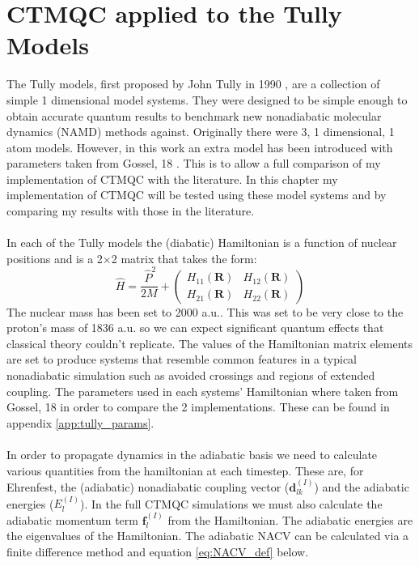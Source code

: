 \chapter{CTMQC applied to the Tully Models}
\label{chap:tully_models}

The Tully models, first proposed by John Tully in 1990 \cite{tully_molecular_1990}, are a collection of simple 1 dimensional model systems. They were designed to be simple enough to obtain accurate quantum results to benchmark new nonadiabatic molecular dynamics (NAMD) methods against. Originally there were 3, 1 dimensional, 1 atom models. However, in this work an extra model has been introduced with parameters taken from Gossel, 18 \cite{gossel_coupled-trajectory_2018}. This is to allow a full comparison of my implementation of CTMQC with the literature. In this chapter my implementation of CTMQC will be tested using these model systems and by comparing my results with those in the literature.
\\\\
In each of the Tully models the (diabatic) Hamiltonian is a function of nuclear positions and is a 2$\times$2 matrix that takes the form:
\begin{equation}
  \hat{H} = \frac{\ \hat{P} ^2}{2M} + \left(
                                              \begin{array}{cc}
                                                H_{11}(\mathbf{R}) & H_{12}(\mathbf{R}) \\
                                                H_{21}(\mathbf{R}) & H_{22}(\mathbf{R})
                                              \end{array}
                                         \right)
\end{equation}
The nuclear mass has been set to 2000 a.u.. This was set to be very close to the proton's mass of 1836 a.u. so we can expect significant quantum effects that classical theory couldn't replicate. The values of the Hamiltonian matrix elements are set to produce systems that resemble common features in a typical nonadiabatic simulation such as avoided crossings and regions of extended coupling. The parameters used in each systems' Hamiltonian where taken from Gossel, 18 \cite{gossel_coupled-trajectory_2018} in order to compare the 2 implementations. These can be found in appendix \ref{app:tully_params}.
\\\\
In order to propagate dynamics in the adiabatic basis we need to calculate various quantities from the hamiltonian at each timestep. These are, for Ehrenfest, the (adiabatic) nonadiabatic coupling vector ($\mathbf{d}_{lk}^{(I)}$) and the adiabatic energies ($E_{l}^{(I)}$). In the full CTMQC simulations we must also calculate the adiabatic momentum term $\mathbf{f}_{l}^{(I)}$ from the Hamiltonian. The adiabatic energies are the eigenvalues of the Hamiltonian. The adiabatic NACV can be calculated via a finite difference method and equation \eqref{eq:NACV_def} below.
